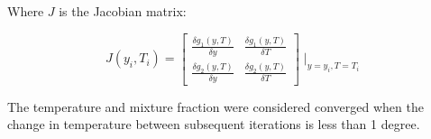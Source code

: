 \documentclass[a4paper, twocolumn]{article}
\begin{document}
Where $J$ is the Jacobian matrix:

\[J(y_i, T_i) = \begin{bmatrix}\frac{\delta g_1(y, T)}{\delta y} & \frac{\delta g_1(y, T)}{\delta T} \\\frac{\delta g_2(y, T)}{\delta y} & \frac{\delta g_2(y, T)}{\delta T}\end{bmatrix}\mid_{y = y_i, T = T_i} \]

The temperature and mixture fraction were considered converged when the change in temperature between subsequent iterations is less than 1 degree.
\end{document}
